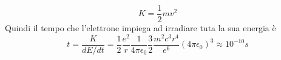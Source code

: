 \documentclass[11pt,a4paper]{article}
\begin{document}
\begin{equation}
K = \frac{1}{2}mv^2
\end{equation}
Quindi il tempo che l'elettrone impiega ad irradiare tuta la sua energia è
\begin{equation}
t = \frac{K}{dE/dt} = \frac{1}{2}\frac{e^2}{r}\frac{1}{4\pi\epsilon_0}\frac{3}{2}\frac{m^2c^3r^4}{e^6}(4\pi\epsilon_0)^3 \approx 10^{-10} s
\end{equation}
\end{document}
